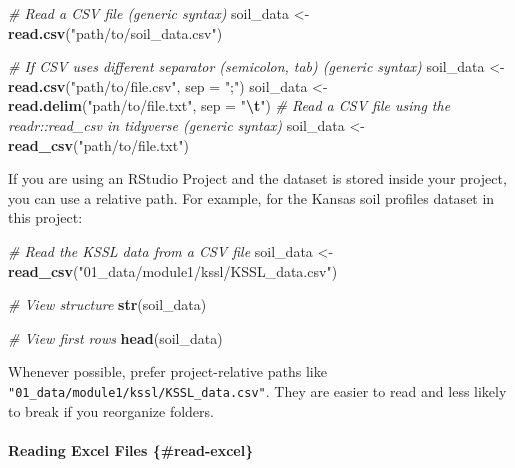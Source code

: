 \documentclass[
  10pt,
  b5paper,
  oneside]{book}
\newenvironment{Shaded}{\begin{snugshade}}{\end{snugshade}}
\newcommand{\AttributeTok}[1]{\textcolor[rgb]{0.13,0.29,0.53}{#1}}
\newcommand{\CommentTok}[1]{\textcolor[rgb]{0.56,0.35,0.01}{\textit{#1}}}
\newcommand{\FunctionTok}[1]{\textcolor[rgb]{0.13,0.29,0.53}{\textbf{#1}}}
\newcommand{\NormalTok}[1]{#1}
\newcommand{\OtherTok}[1]{\textcolor[rgb]{0.56,0.35,0.01}{#1}}
\newcommand{\SpecialCharTok}[1]{\textcolor[rgb]{0.81,0.36,0.00}{\textbf{#1}}}
\newcommand{\StringTok}[1]{\textcolor[rgb]{0.31,0.60,0.02}{#1}}
\begin{document}
\begin{Shaded}
\begin{Highlighting}[]
\CommentTok{\# Read a CSV file (generic syntax)}
\NormalTok{soil\_data }\OtherTok{\textless{}{-}} \FunctionTok{read.csv}\NormalTok{(}\StringTok{"path/to/soil\_data.csv"}\NormalTok{)}

\CommentTok{\# If CSV uses different separator (semicolon, tab) (generic syntax)}
\NormalTok{soil\_data }\OtherTok{\textless{}{-}} \FunctionTok{read.csv}\NormalTok{(}\StringTok{"path/to/file.csv"}\NormalTok{, }\AttributeTok{sep =} \StringTok{";"}\NormalTok{)}
\NormalTok{soil\_data }\OtherTok{\textless{}{-}} \FunctionTok{read.delim}\NormalTok{(}\StringTok{"path/to/file.txt"}\NormalTok{, }\AttributeTok{sep =} \StringTok{"}\SpecialCharTok{\textbackslash{}t}\StringTok{"}\NormalTok{)}
\CommentTok{\# Read a CSV file using the \textasciigrave{}readr::read\_csv\textasciigrave{} in tidyverse  (generic syntax)}
\NormalTok{soil\_data }\OtherTok{\textless{}{-}} \FunctionTok{read\_csv}\NormalTok{(}\StringTok{"path/to/file.txt"}\NormalTok{)}
\end{Highlighting}
\end{Shaded}

If you are using an RStudio Project and the dataset is stored inside your project, you can use a relative path. For example, for the Kansas soil profiles dataset in this project:

\begin{Shaded}
\begin{Highlighting}[]
\CommentTok{\# Read the KSSL data from a CSV file}
\NormalTok{soil\_data }\OtherTok{\textless{}{-}} \FunctionTok{read\_csv}\NormalTok{(}\StringTok{"01\_data/module1/kssl/KSSL\_data.csv"}\NormalTok{)}

\CommentTok{\# View structure}
\FunctionTok{str}\NormalTok{(soil\_data)}

\CommentTok{\# View first rows}
\FunctionTok{head}\NormalTok{(soil\_data)}
\end{Highlighting}
\end{Shaded}

Whenever possible, prefer project-relative paths like \texttt{"01\_data/module1/kssl/KSSL\_data.csv"}.
They are easier to read and less likely to break if you reorganize folders.

\paragraph*{Reading Excel Files \{\#read-excel\}}\label{reading-excel-files-read-excel}
\end{document}
